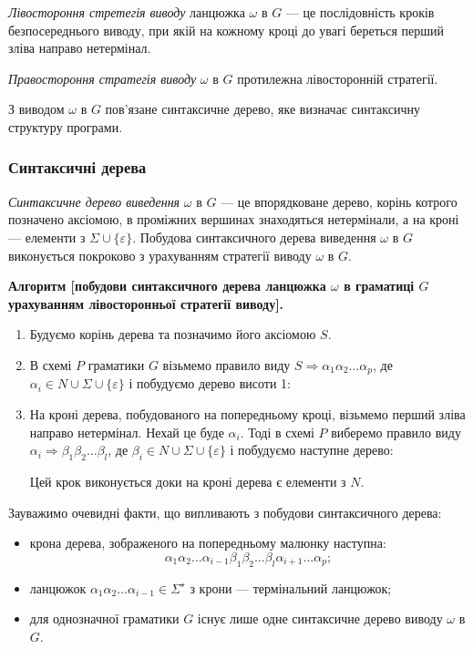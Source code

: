 \textit{Лівостороння стретегія виводу} ланцюжка $\omega$ в $G$ --- це послідовність кроків безпосереднього виводу, при якій на кожному кроці до увагі береться перший зліва направо нетермінал. \medskip

\textit{Правостороння стратегія виводу} $\omega$ в $G$ протилежна лівосторонній стратегії. \medskip

З виводом $\omega$ в $G$ пов'язане синтаксичне дерево, яке визначає синтаксичну структуру програми.

\subsubsection{Синтаксичні дерева}

\textit{Синтаксичне дерево виведення} $\omega$ в $G$ --- це впорядковане дерево, корінь котрого позначено аксіомою, в проміжних вершинах знаходяться нетермінали, а на кроні --- елементи з $\Sigma \cup \{\varepsilon\}$. Побудова синтаксичного дерева виведення $\omega$ в $G$ виконується покроково з урахуванням стратегії виводу $\omega$ в $G$. \medskip


\textbf{Алгоритм [побудови синтаксичного дерева ланцюжка $\omega$ в граматиці $G$ урахуванням лівосторонньої стратегії виводу].}
\begin{enumerate}
	\item Будуємо корінь дерева та позначимо його аксіомою $S$.

	\item В схемі $P$ граматики $G$ візьмемо правило виду $S \Rightarrow \alpha_1 \alpha_2 \ldots \alpha_p$, де $\alpha_i \in N \cup \Sigma \cup \{\varepsilon\} $	і побудуємо дерево висоти 1: 
	\begin{figure}[H]
		\centering
		
	\end{figure}

	\item На кроні дерева, побудованого на попередньому кроці, візьмемо перший зліва направо нетермінал. Нехай це буде $\alpha_i$. Тоді в схемі $P$ виберемо правило виду $\alpha_i \Rightarrow \beta_1 \beta_2 \ldots \beta_l$, де $\beta_i \in N \cup \Sigma \cup \{\varepsilon\}$ і побудуємо наступне дерево: 
	\begin{figure}[H]
		\centering
		
	\end{figure}

	Цей крок виконується доки на кроні дерева є елементи з $N$.
\end{enumerate}

Зауважимо очевидні факти, що випливають з побудови синтаксичного дерева:
\begin{itemize}
	\item крона дерева, зображеного на попередньому малюнку наступна: \[\alpha_1 \alpha_2 \ldots \alpha_{i - 1} \beta_1 \beta_2 \ldots \beta_l \alpha_{i + 1} \ldots \alpha_p;\]
	\item ланцюжок $\alpha_1 \alpha_2 \ldots \alpha_{i - 1} \in \Sigma^\star$ з крони --- термінальний ланцюжок;
	\item для однозначної граматики $G$ існує лише одне синтаксичне дерево виводу $\omega$ в $G$.
\end{itemize}

